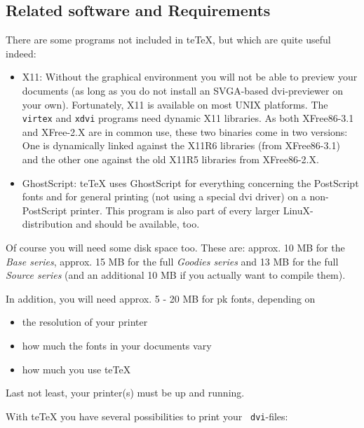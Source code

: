 \documentclass[12pt,a4paper]{article}
\newcommand{\teTeX}{\textrm{te}\TeX\xspace}
\newcommand{\Linux}{\textrm{Linu}\textsf{X}\xspace}
\begin{document}
\subsection{Related software and Requirements}
\label{ssec:req}

There are some programs not included in \teTeX{}, but which
are quite useful indeed:

\begin{itemize}
  
\item X11: Without the graphical environment you will not be
  able to preview your documents (as long as you do not
  install an SVGA-based dvi-previewer on your own).
  Fortunately, X11 is available on most UNIX platforms. The
  {\tt virtex} and {\tt xdvi} programs need dynamic X11
  libraries. As both XFree86-3.1 and XFree-2.X are in common
  use, these two binaries come in two versions: One is
  dynamically linked against the X11R6 libraries (from
  XFree86-3.1) and the other one against the old X11R5
  libraries from XFree86-2.X.
  
\item GhostScript: \teTeX{} uses GhostScript for everything
  concerning the Post\-Script fonts and for general printing
  (not using a special dvi driver) on a non-PostScript
  printer. This program is also part of every larger
  \Linux{}-distribution and should be available, too.

\end{itemize}

Of course you will need some disk space too. These are:
approx. 10 MB for the \emph{Base series}, approx. 15 MB for
the full \emph{Goodies series} and 13 MB for the full
\emph{Source series} (and an additional 10 MB if you actually
want to compile them).

In addition, you will need approx. 5 - 20 MB for pk fonts,
depending on
\begin{itemize}
\item the resolution of your printer
\item how much the fonts in your documents vary
\item how much you use \teTeX
\end{itemize}

Last not least, your printer(s) must be up and running.

With \teTeX{} you have several possibilities to print your {\tt
  dvi}-files:
\end{document}
